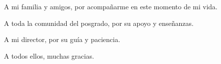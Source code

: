 \documentclass[
11pt, %
spanish,
singlespacing, %
parskip, %
headsepline, %
]{MastersDoctoralThesis} %
\author{Ing. Nicolás Ezequiel Iriarte Fernandez} %
\begin{document}
\frontmatter %

\pagestyle{plain} %



\begin{abstract}
  \addchaptertocentry{\abstractname} %
  En la presente memoria se describe el diseño e implementación de un emulador de microprocesador LEON3 desarrollado para la empresa INVAP. SE, pensado para su uso en simulaciones espaciales. Este trabajo abarca las etapas de diseño, planificación, desarrollo y documentación, con la finalidad de ofrecer una herramienta robusta que se adapte a las necesidades de la industria espacial.
Para su realización, se aplicaron conocimientos adquiridos en  arquitectura de microprocesadores, programación de microcontroladores y protocolos de comunicación.
\centering


\end{abstract}


\begin{acknowledgements}
\vspace{1.5cm}

A mi familia y amigos, por acompañarme en este momento de mi vida.

A toda la comunidad del posgrado, por su apoyo y enseñanzas.

A mi director, por su guía y paciencia.

A todos ellos, muchas gracias.


\end{acknowledgements}

\end{document}
